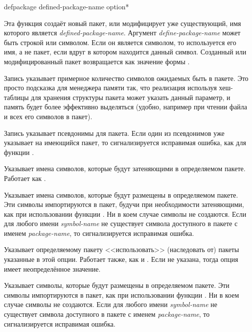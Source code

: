 \begin{defmac}
defpackage defined-package-name {option}*

Эта функция создаёт новый пакет, или модифицирует уже существующий, имя которого
является \emph{defined-package-name}. Аргумент \emph{define-package-name} может
быть строкой или символом.
Если он является символом, то используется его имя, а не пакет, если
вдруг в котором находится данный символ.
Созданный или модифицированный пакет возвращается как значение формы
.

\begin{flushdesc}
\item[\cd{(:size \emph{integer})}]
Запись указывает примерное количество символов ожидаемых быть в пакете. 
Это просто подсказка для менеджера памяти так, что реализация используя
хеш-таблицы для хранения структуры пакета может указать данный параметр, и
память будет более эффективно выделяться (удобно, например при чтении файла и
всех его символов в пакет).

\item[\cd{(:nicknames \Mstar\emph{package-name})}]
Запись указывает псевдонимы для пакета.
Если один из псевдонимов уже указывает на имеющийся пакет, то сигнализируется
исправимая ошибка, как для функции .

\item[\cd{(:shadow \Mstar\emph{symbol-name})}]
Указывает имена символов, которые будут затеняющими в определяемом
пакете. Работает как .

\item[\cd{(:shadowing-import-from \emph{package-name} \Mstar\emph{symbol-name})}]
Указывает имена символов, которые будут размещены в определяемом пакете.
Эти символы импортируются в пакет, будучи при необходимости затеняющими, как при
использовании функции .
Ни в коем случае символы не создаются.
Если для любого имени \emph{symbol-name} не существует символа доступного в
пакете с именем \emph{package-name}, то сигнализируется исправимая ошибка.

\item[\cd{(:use \Mstar\emph{package-name})}]
Указывает определяемому пакету <<использовать>> (наследовать от) пакеты
указанные в этой опции. Работает также, как и .
Если  не указана, тогда опция имеет неопределённое значение.

\item[\cd{(:import-from \emph{package-name} \Mstar\emph{symbol-name})}]
Указывает символы, которые будут размещены в определяемом пакете.
Эти символы импортируются в пакет, как при использовании функции .
Ни в коем случае символы не создаются.
Если для любого имени \emph{symbol-name} не существует символа доступного в
пакете с именем \emph{package-name}, то сигнализируется исправимая ошибка.


\end{flushdesc}
\end{defmac}
